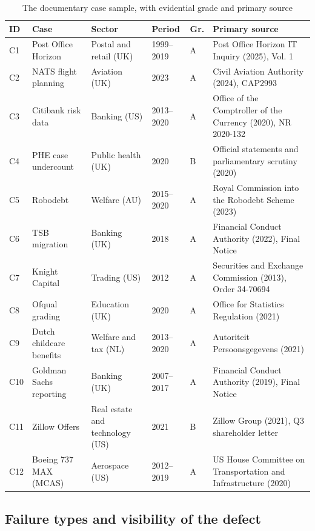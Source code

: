 \documentclass[12pt,a4paper]{article}
\begin{document}
\begin{table}[H]
\centering\footnotesize
\caption{The documentary case sample, with evidential grade and primary source}
\label{tab:cases}
\begin{tabularx}{\textwidth}{@{}p{0.7cm} p{2.9cm} p{2.5cm} p{1.5cm} p{0.7cm} X@{}}
\toprule
\textbf{ID} & \textbf{Case} & \textbf{Sector} & \textbf{Period} & \textbf{Gr.} & \textbf{Primary source} \\
\midrule
C1 & Post Office Horizon & Postal and retail (UK) & 1999--2019 & A & Post Office Horizon IT Inquiry (2025), Vol. 1 \\
C2 & NATS flight planning & Aviation (UK) & 2023 & A & Civil Aviation Authority (2024), CAP2993 \\
C3 & Citibank risk data & Banking (US) & 2013--2020 & A & Office of the Comptroller of the Currency (2020), NR 2020-132 \\
C4 & PHE case undercount & Public health (UK) & 2020 & B & Official statements and parliamentary scrutiny (2020) \\
C5 & Robodebt & Welfare (AU) & 2015--2020 & A & Royal Commission into the Robodebt Scheme (2023) \\
C6 & TSB migration & Banking (UK) & 2018 & A & Financial Conduct Authority (2022), Final Notice \\
C7 & Knight Capital & Trading (US) & 2012 & A & Securities and Exchange Commission (2013), Order 34-70694 \\
C8 & Ofqual grading & Education (UK) & 2020 & A & Office for Statistics Regulation (2021) \\
C9 & Dutch childcare benefits & Welfare and tax (NL) & 2013--2020 & A & Autoriteit Persoonsgegevens (2021) \\
C10 & Goldman Sachs reporting & Banking (UK) & 2007--2017 & A & Financial Conduct Authority (2019), Final Notice \\
C11 & Zillow Offers & Real estate and technology (US) & 2021 & B & Zillow Group (2021), Q3 shareholder letter \\
C12 & Boeing 737 MAX (MCAS) & Aerospace (US) & 2012--2019 & A & US House Committee on Transportation and Infrastructure (2020) \\
\bottomrule
\end{tabularx}
\end{table}

\subsection{Failure types and visibility of the defect}
\end{document}
